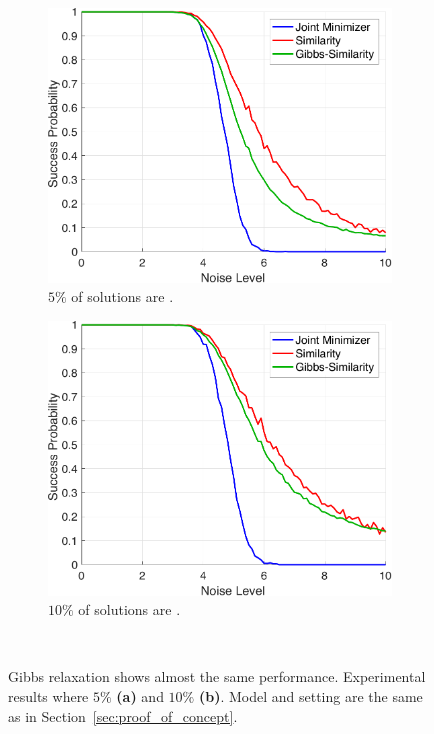 \begin{figure}[t!]
  \centering
  \begin{subfigure}[b]{.49\textwidth}
      \includegraphics[width=\linewidth]{figures/ch_generic_approach/gnm_g50_b950_gibbs}
      \caption{$5\%$ of solutions are \good.}
      \label{fig:gnm_5_gibbs}
  \end{subfigure}
  \hfill
  \begin{subfigure}[b]{.49\textwidth}
      \includegraphics[width=\linewidth]{figures/ch_generic_approach/gnm_g100_b900_gibbs}
      \caption{$10\%$ of solutions are \good.}
      \label{fig:gnm_10_gibbs}
  \end{subfigure}
  \\[.5cm]
  \caption{Gibbs relaxation shows almost the same performance. Experimental
    results where $5\%$ \textbf{(a)} and $10\%$ \textbf{(b)}. Model and setting
    are the same as in Section~\ref{sec:proof_of_concept}.}
  \label{fig:gnm_gibbs}
\end{figure}

